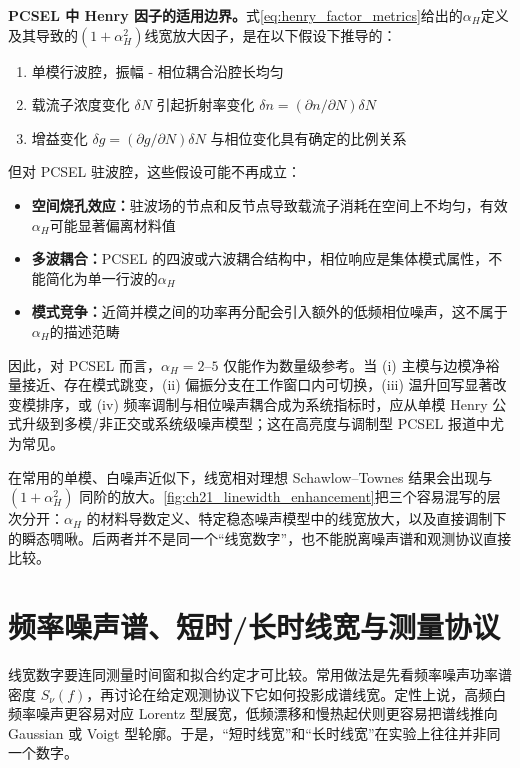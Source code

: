 \begin{warningbox}
\textbf{PCSEL 中 Henry 因子的适用边界。}式\cref{eq:henry_factor_metrics}给出的$\alpha_H$定义及其导致的$(1+\alpha_H^2)$线宽放大因子，是在以下假设下推导的：
\begin{enumerate}
  \item 单模行波腔，振幅 - 相位耦合沿腔长均匀
  \item 载流子浓度变化 $\delta N$ 引起折射率变化 $\delta n = (\partial n/\partial N)\delta N$
  \item 增益变化 $\delta g = (\partial g/\partial N)\delta N$ 与相位变化具有确定的比例关系
\end{enumerate}
但对 PCSEL 驻波腔，这些假设可能不再成立：
\begin{itemize}
  \item \textbf{空间烧孔效应：}驻波场的节点和反节点导致载流子消耗在空间上不均匀，有效$\alpha_H$可能显著偏离材料值
  \item \textbf{多波耦合：}PCSEL 的四波或六波耦合结构中，相位响应是集体模式属性，不能简化为单一行波的$\alpha_H$
  \item \textbf{模式竞争：}近简并模之间的功率再分配会引入额外的低频相位噪声，这不属于$\alpha_H$的描述范畴
\end{itemize}
因此，对 PCSEL 而言，$\alpha_H=2$--$5$ 仅能作为数量级参考。当 (i) 主模与边模净裕量接近、存在模式跳变，(ii) 偏振分支在工作窗口内可切换，(iii) 温升回写显著改变模排序，或 (iv) 频率调制与相位噪声耦合成为系统指标时，应从单模 Henry 公式升级到多模/非正交或系统级噪声模型；这在高亮度与调制型 PCSEL 报道中尤为常见\cite{suh2004tcmt,itoh2020,yoshida2023}。
\end{warningbox}

在常用的单模、白噪声近似下，线宽相对理想 Schawlow--Townes 结果会出现与 $(1+\alpha_H^2)$ 同阶的放大。\cref{fig:ch21_linewidth_enhancement}把三个容易混写的层次分开：$\alpha_H$ 的材料导数定义、特定稳态噪声模型中的线宽放大，以及直接调制下的瞬态啁啾。后两者并不是同一个“线宽数字”，也不能脱离噪声谱和观测协议直接比较。


\section{频率噪声谱、短时/长时线宽与测量协议}
线宽数字要连同测量时间窗和拟合约定才可比较。常用做法是先看频率噪声功率谱密度 $S_\nu(f)$，再讨论在给定观测协议下它如何投影成谱线宽。定性上说，高频白频率噪声更容易对应 Lorentz 型展宽，低频漂移和慢热起伏则更容易把谱线推向 Gaussian 或 Voigt 型轮廓。于是，“短时线宽”和“长时线宽”在实验上往往并非同一个数字。

